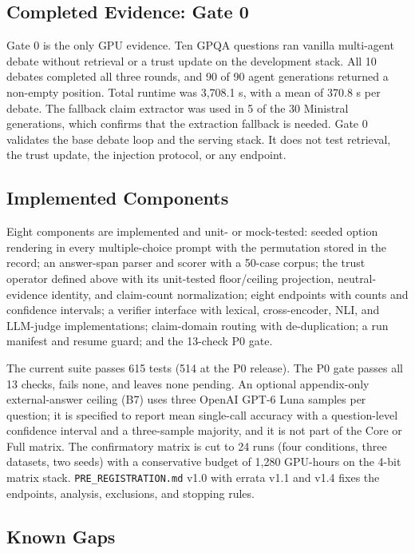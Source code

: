 \documentclass[a4paper,fleqn]{cas-sc}
\begin{document}
\subsection{Completed Evidence: Gate 0}

Gate 0 is the only GPU evidence. Ten GPQA questions ran vanilla multi-agent debate without retrieval or a trust update on the development stack. All 10 debates completed all three rounds, and 90 of 90 agent generations returned a non-empty position. Total runtime was 3{,}708.1 s, with a mean of 370.8 s per debate. The fallback claim extractor was used in 5 of the 30 Ministral generations, which confirms that the extraction fallback is needed. Gate 0 validates the base debate loop and the serving stack. It does not test retrieval, the trust update, the injection protocol, or any endpoint.

\subsection{Implemented Components}

Eight components are implemented and unit- or mock-tested: seeded option rendering in every multiple-choice prompt with the permutation stored in the record; an answer-span parser and scorer with a 50-case corpus; the trust operator defined above with its unit-tested floor/ceiling projection, neutral-evidence identity, and claim-count normalization; eight endpoints with counts and confidence intervals; a verifier interface with lexical, cross-encoder, NLI, and LLM-judge implementations; claim-domain routing with de-duplication; a run manifest and resume guard; and the 13-check P0 gate.

The current suite passes 615 tests (514 at the P0 release). The P0 gate passes all 13 checks, fails none, and leaves none pending. An optional appendix-only external-answer ceiling (B7) uses three OpenAI GPT-6 Luna samples per question; it is specified to report mean single-call accuracy with a question-level confidence interval and a three-sample majority, and it is not part of the Core or Full matrix. The confirmatory matrix is cut to 24 runs (four conditions, three datasets, two seeds) with a conservative budget of 1{,}280 GPU-hours on the 4-bit matrix stack. \texttt{PRE\_REGISTRATION.md} v1.0 with errata v1.1 and v1.4 fixes the endpoints, analysis, exclusions, and stopping rules.

\subsection{Known Gaps}
\end{document}
